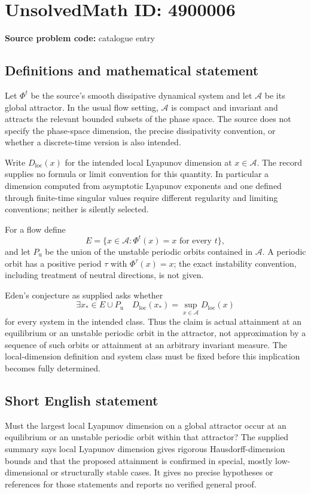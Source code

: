 \documentclass[11pt]{article}
\begin{document}
\section*{UnsolvedMath ID: 4900006}
\textbf{Source problem code:} catalogue entry
\subsection{Definitions and mathematical statement}
Let $\Phi^t$ be the source's smooth dissipative dynamical system and let $\mathcal A$ be its global attractor. In the usual flow setting, $\mathcal A$ is compact and invariant and attracts the relevant bounded subsets of the phase space. The source does not specify the phase-space dimension, the precise dissipativity convention, or whether a discrete-time version is also intended.

Write $D_{\mathrm{loc}}(x)$ for the intended local Lyapunov dimension at $x\in\mathcal A$. The record supplies no formula or limit convention for this quantity. In particular a dimension computed from asymptotic Lyapunov exponents and one defined through finite-time singular values require different regularity and limiting conventions; neither is silently selected.

For a flow define
\[
 E=\{x\in\mathcal A:\Phi^t(x)=x\text{ for every }t\},
\]
and let $P_{\mathrm{u}}$ be the union of the unstable periodic orbits contained in $\mathcal A$. A periodic orbit has a positive period $\tau$ with $\Phi^\tau(x)=x$; the exact instability convention, including treatment of neutral directions, is not given.

Eden's conjecture as supplied asks whether
\[
 \exists x_*\in E\cup P_{\mathrm{u}}\quad
 D_{\mathrm{loc}}(x_*)=
      \sup_{x\in\mathcal A}D_{\mathrm{loc}}(x)
\]
for every system in the intended class. Thus the claim is actual attainment at an equilibrium or an unstable periodic orbit in the attractor, not approximation by a sequence of such orbits or attainment at an arbitrary invariant measure. The local-dimension definition and system class must be fixed before this implication becomes fully determined.
\subsection{Short English statement}
Must the largest local Lyapunov dimension on a global attractor occur at an equilibrium or an unstable periodic orbit within that attractor? The supplied summary says local Lyapunov dimension gives rigorous Hausdorff-dimension bounds and that the proposed attainment is confirmed in special, mostly low-dimensional or structurally stable cases. It gives no precise hypotheses or references for those statements and reports no verified general proof.
\end{document}
